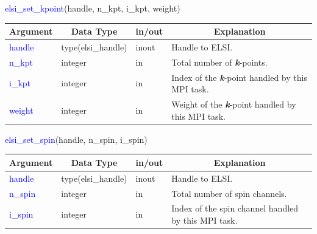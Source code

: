 \documentclass{report}
\begin{document}
\begin{labeling}{\hspace{6cm}}
\item [\hspace{0.3cm} \textcolor{blue}{elsi\_set\_kpoint}(handle, n\_kpt, i\_kpt, weight)]
\end{labeling}

\begin{tabular}[]{|p{30mm}|p{30mm}|p{15mm}|p{90mm}|}
\hline
\multicolumn{1}{|c|}{\textbf{Argument}} & \multicolumn{1}{c|}{\textbf{Data Type}} & \multicolumn{1}{c|}{\textbf{in/out}} & \multicolumn{1}{c|}{\textbf{Explanation}}\\
\hline
\textcolor{blue}{handle} & type(elsi\_handle) & inout & Handle to ELSI.\\
\hline
\textcolor{blue}{n\_kpt} & integer            & in    & Total number of \textbf{\textit{k}}-points.\\
\hline
\textcolor{blue}{i\_kpt} & integer            & in    & Index of the \textbf{\textit{k}}-point handled by this MPI task.\\
\hline
\textcolor{blue}{weight} & integer            & in    & Weight of the \textbf{\textit{k}}-point handled by this MPI task.\\
\hline
\end{tabular}

\bigskip
\begin{labeling}{\hspace{6cm}}
\item [\hspace{0.3cm} \textcolor{blue}{elsi\_set\_spin}(handle, n\_spin, i\_spin)]
\end{labeling}

\begin{tabular}[]{|p{30mm}|p{30mm}|p{15mm}|p{90mm}|}
\hline
\multicolumn{1}{|c|}{\textbf{Argument}} & \multicolumn{1}{c|}{\textbf{Data Type}} & \multicolumn{1}{c|}{\textbf{in/out}} & \multicolumn{1}{c|}{\textbf{Explanation}}\\
\hline
\textcolor{blue}{handle}  & type(elsi\_handle) & inout & Handle to ELSI.\\
\hline
\textcolor{blue}{n\_spin} & integer            & in    & Total number of spin channels.\\
\hline
\textcolor{blue}{i\_spin} & integer            & in    & Index of the spin channel handled by this MPI task.\\
\hline
\end{tabular}
\end{document}
